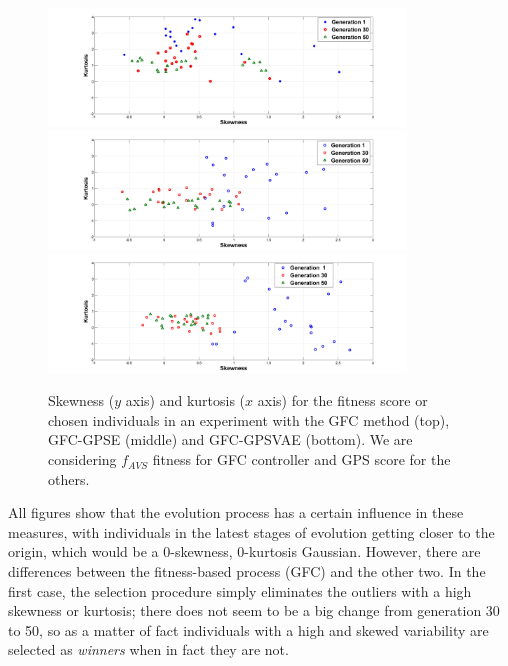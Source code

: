 \documentclass[10pt,journal,compsoc]{IEEEtran}
\begin{document}
\begin{figure}[ht]	
	\begin{center}
          \includegraphics[width=9.5cm]{fig/GFC__.jpg}
          \includegraphics[width=9.5cm]{fig/GFCRSE__.jpg}
          \includegraphics[width=9.5cm]{fig/GFCVARSE__.jpg}
		\caption{Skewness ($y$ axis) and kurtosis ($x$ axis)
                  for the fitness score or chosen individuals in an experiment with the {\sf GFC} method \cite{salem_cig2018} (top), {\sf GFC-GPSE} (middle) and {\sf GFC-GPSVAE} (bottom). We are considering $f_{AVS}$ fitness for GFC controller and GPS score for the others.}
		\label{fig:gfcsk} \label{fig:gfcrsesk} \label{fig:gfcvarsesk}			
	\end{center}	
\end{figure}

All figures show that the evolution process has a certain influence in
these measures, with individuals in the latest stages of evolution
getting closer to the origin, which would be a 0-skewness, 0-kurtosis
Gaussian. However, there are differences between the fitness-based
process ({\sf GFC}) and the other two. In the first case, the
selection procedure simply eliminates the outliers with a high
skewness or kurtosis; there does not seem to be a big change from
generation 30 to 50, so as a matter of fact individuals with a high
and skewed variability are selected as {\em winners} when in fact they
are not.
\end{document}
